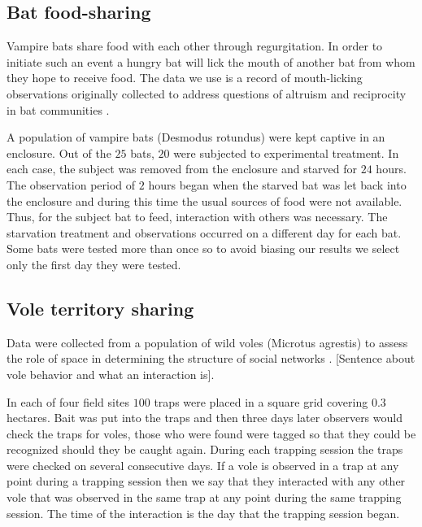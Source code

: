 \documentclass[10pt]{article}
\begin{document}
\begin{multicols}{2}


\subsection{Bat food-sharing}
Vampire bats share food with each other through regurgitation. In order to initiate such an event a hungry bat will lick the mouth of another bat from whom they hope to receive food. The data we use is a record of mouth-licking observations originally collected to address questions of altruism and reciprocity in bat communities \cite{Carter20122573,dryad_tg7b1}.

A population of vampire bats (Desmodus rotundus) were kept captive in an enclosure. Out of the $25$ bats, $20$ were subjected to experimental treatment. In each case, the subject was removed from the enclosure and starved for $24$ hours. The observation period of $2$ hours began when the starved bat was let back into the enclosure and during this time the usual sources of food were not available. Thus, for the subject bat to feed, interaction with others was necessary. The starvation treatment and observations occurred on a different day for each bat. Some bats were tested more than once so to avoid biasing our results we select only the first day they were tested. 

\subsection{Vole territory sharing} 
Data were collected from a population of wild voles (Microtus agrestis) to assess the role of space in determining the structure of social networks \cite{Davis20141004}. [Sentence about vole behavior and what an interaction is].

In each of four field sites $100$ traps were placed in a square grid covering $0.3$ hectares. Bait was put into the traps and then three days later observers would check the traps for voles, those who were found were tagged so that they could be recognized should they be caught again. During each trapping session the traps were checked on several consecutive days. If a vole is observed in a trap at any point during a trapping session then we say that they interacted with any other vole that was observed in the same trap at any point during the same trapping session. The time of the interaction is the day that the trapping session began. 


\end{multicols}
\end{document}
